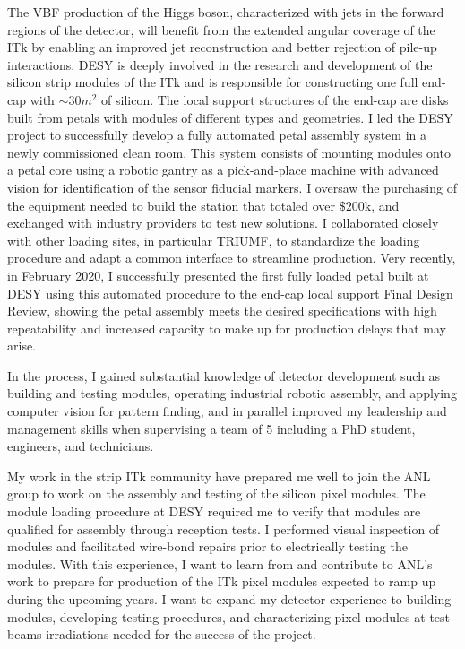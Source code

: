 \documentclass[a4paper]{article}
\begin{document}
The VBF production of the Higgs boson, characterized with jets in the forward regions of the detector, will benefit from the extended angular coverage of the ITk by enabling an improved jet reconstruction and better rejection of pile-up interactions.
DESY is deeply involved in the research and development of the silicon strip modules of the ITk and is responsible for constructing one full end-cap
with $\sim 30 m^2$ of silicon. The local support structures of the end-cap are disks built from petals with modules of different types and geometries.
I led the DESY project to successfully develop a fully automated petal assembly system in a newly commissioned clean room.
This system consists of mounting modules onto a petal core using a robotic gantry as a pick-and-place machine with advanced vision for identification of the sensor fiducial markers. I oversaw the purchasing of the equipment needed to build the station that totaled over $\$200$k, and exchanged with industry providers to test new solutions. I collaborated closely with other loading sites, in particular TRIUMF, to standardize the loading procedure and adapt a common interface to streamline production.
Very recently, in February 2020, I successfully presented the first fully loaded petal built at DESY using this automated procedure to the end-cap local support Final Design Review, showing the petal assembly meets the desired specifications with high repeatability and increased capacity to make up for production delays that may arise.


In the process, I gained substantial knowledge of detector development such as building and testing modules, operating industrial robotic assembly, and applying computer vision for pattern finding, and in parallel improved my leadership and management skills when supervising a team of 5 including a PhD student, engineers, and technicians.

My work in the strip ITk community have prepared me well to join the ANL group to work on the assembly and testing of the silicon pixel modules.
The module loading procedure at DESY required me to verify that modules are qualified for assembly through reception tests. I performed visual inspection of modules and facilitated wire-bond repairs prior to electrically testing the modules.
With this experience, I want to learn from and contribute to ANL's work to prepare for production of the ITk pixel modules expected to ramp up during the upcoming years. I want to expand my detector experience to building modules, developing testing procedures, and characterizing pixel modules at test beams irradiations needed for the success of the project.
\end{document}
